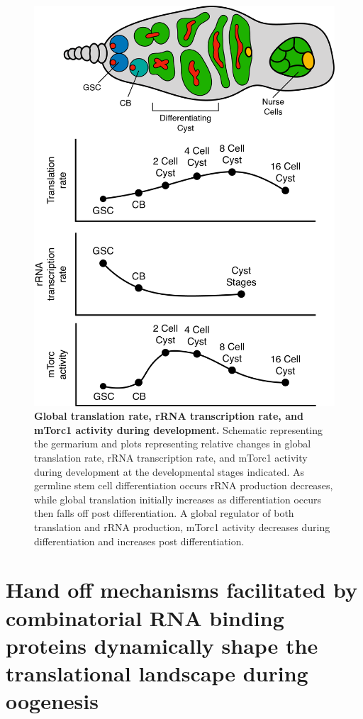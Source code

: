 \documentclass[12pt,oneside]{reedthesis}
\begin{document}
\begin{figure}

{\centering \includegraphics[width=4.536585 in,height=6 in]{./figure/Book Chapter/Figure3} 

}

\caption[\textbf{Global translation rate, rRNA transcription rate, and mTorc1 activity during development.}]{\textbf{Global translation rate, rRNA transcription rate, and mTorc1 activity during development.} Schematic representing the germarium and plots representing relative changes in global translation rate, rRNA transcription rate, and mTorc1 activity during development at the developmental stages indicated. As germline stem cell differentiation occurs rRNA production decreases, while global translation initially increases as differentiation occurs then falls off post differentiation. A global regulator of both translation and rRNA production, mTorc1 activity decreases during differentiation and increases post differentiation.}\label{fig:unnamed-chunk-6}
\end{figure}
\hypertarget{hand-off-mechanisms-facilitated-by-combinatorial-rna-binding-proteins-dynamically-shape-the-translational-landscape-during-oogenesis}{%
\section{Hand off mechanisms facilitated by combinatorial RNA binding proteins dynamically shape the translational landscape during oogenesis}\label{hand-off-mechanisms-facilitated-by-combinatorial-rna-binding-proteins-dynamically-shape-the-translational-landscape-during-oogenesis}}
\end{document}
